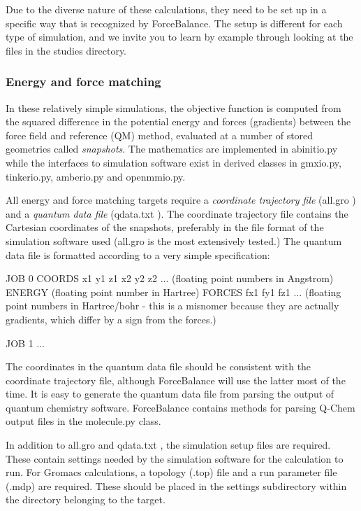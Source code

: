Due to the diverse nature of these calculations, they need to be set up in a specific way that is recognized by Force\-Balance. The setup is different for each type of simulation, and we invite you to learn by example through looking at the files in the {\ttfamily studies} directory.\hypertarget{usage_energy_force_matching}{}\subsubsection{Energy and force matching}\label{usage_energy_force_matching}
In these relatively simple simulations, the objective function is computed from the squared difference in the potential energy and forces (gradients) between the force field and reference (Q\-M) method, evaluated at a number of stored geometries called {\itshape snapshots}. The mathematics are implemented in {\ttfamily abinitio.\-py} while the interfaces to simulation software exist in derived classes in {\ttfamily gmxio.\-py}, {\ttfamily tinkerio.\-py}, {\ttfamily amberio.\-py} and {\ttfamily openmmio.\-py}.

All energy and force matching targets require a {\itshape coordinate trajectory file} ({\ttfamily all.\-gro} ) and a {\itshape  quantum data file } ({\ttfamily qdata.\-txt} ). The coordinate trajectory file contains the Cartesian coordinates of the snapshots, preferably in the file format of the simulation software used ({\ttfamily all.\-gro} is the most extensively tested.) The quantum data file is formatted according to a very simple specification\-:

\begin{DoxyVerb}JOB 0
COORDS x1 y1 z1 x2 y2 z2 ... (floating point numbers in Angstrom)
ENERGY (floating point number in Hartree)
FORCES fx1 fy1 fz1 ... (floating point numbers in Hartree/bohr - this is a misnomer because they are actually gradients, which differ by a sign from the forces.)

JOB 1
...
\end{DoxyVerb}


The coordinates in the quantum data file should be consistent with the coordinate trajectory file, although Force\-Balance will use the latter most of the time. It is easy to generate the quantum data file from parsing the output of quantum chemistry software. Force\-Balance contains methods for parsing Q-\/\-Chem output files in the {\ttfamily molecule.\-py} class.

In addition to {\ttfamily all.\-gro} and {\ttfamily qdata.\-txt} , the simulation setup files are required. These contain settings needed by the simulation software for the calculation to run. For Gromacs calculations, a topology (.top) file and a run parameter file (.mdp) are required. These should be placed in the {\ttfamily settings} subdirectory within the directory belonging to the target.

